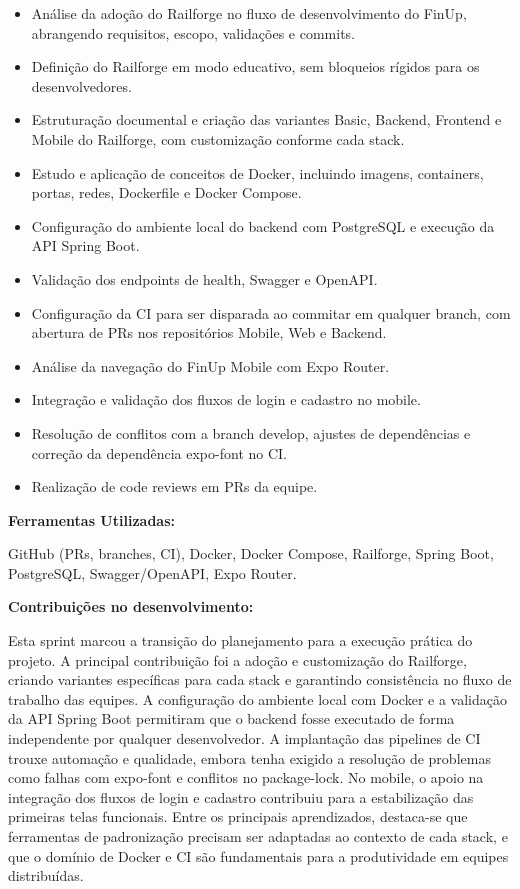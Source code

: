\begin{itemize}
\item
  Análise da adoção do Railforge no fluxo de desenvolvimento do FinUp,
  abrangendo requisitos, escopo, validações e commits.
\item
  Definição do Railforge em modo educativo, sem bloqueios rígidos para
  os desenvolvedores.
\item
  Estruturação documental e criação das variantes Basic, Backend,
  Frontend e Mobile do Railforge, com customização conforme cada stack.
\item
  Estudo e aplicação de conceitos de Docker, incluindo imagens,
  containers, portas, redes, Dockerfile e Docker Compose.
\item
  Configuração do ambiente local do backend com PostgreSQL e execução da
  API Spring Boot.
\item
  Validação dos endpoints de health, Swagger e OpenAPI.
\item
  Configuração da CI para ser disparada ao commitar em qualquer branch,
  com abertura de PRs nos repositórios Mobile, Web e Backend.
\item
  Análise da navegação do FinUp Mobile com Expo Router.
\item
  Integração e validação dos fluxos de login e cadastro no mobile.
\item
  Resolução de conflitos com a branch develop, ajustes de dependências e
  correção da dependência expo-font no CI.
\item
  Realização de code reviews em PRs da equipe.
\end{itemize}

\textbf{Ferramentas Utilizadas:}

GitHub (PRs, branches, CI), Docker, Docker Compose, Railforge, Spring
Boot, PostgreSQL, Swagger/OpenAPI, Expo Router.

\textbf{Contribuições no desenvolvimento:}

Esta sprint marcou a transição do planejamento para a execução prática
do projeto. A principal contribuição foi a adoção e customização do
Railforge, criando variantes específicas para cada stack e garantindo
consistência no fluxo de trabalho das equipes. A configuração do
ambiente local com Docker e a validação da API Spring Boot permitiram
que o backend fosse executado de forma independente por qualquer
desenvolvedor. A implantação das pipelines de CI trouxe automação e
qualidade, embora tenha exigido a resolução de problemas como falhas com
expo-font e conflitos no package-lock. No mobile, o apoio na integração
dos fluxos de login e cadastro contribuiu para a estabilização das
primeiras telas funcionais. Entre os principais aprendizados, destaca-se
que ferramentas de padronização precisam ser adaptadas ao contexto de
cada stack, e que o domínio de Docker e CI são fundamentais para a
produtividade em equipes distribuídas.

